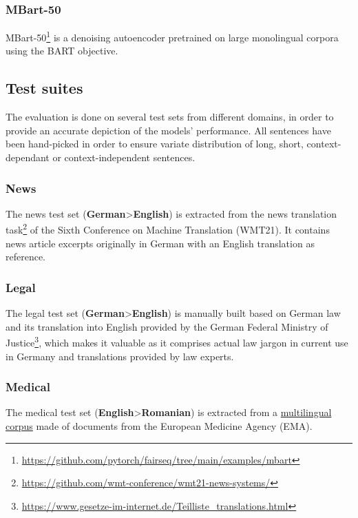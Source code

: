 \documentclass[11pt]{article}
\begin{document}
\subsubsection{MBart-50}
MBart-50\footnote{\url{https://github.com/pytorch/fairseq/tree/main/examples/mbart}} \citep{liu2020multilingual} is a denoising autoencoder pretrained on large monolingual corpora
using the BART \citep{lewis-etal-2020-bart} objective.

\subsection{Test suites}

The evaluation is done on several test sets from different domains, in order to provide
an accurate depiction of the models' performance.
All sentences have been hand-picked in order to ensure variate distribution of
long, short, context-dependant or context-independent sentences.

\subsubsection{News}

The news test set (\textbf{German}>\textbf{English})
is extracted from the news translation
task\footnote{\url{https://github.com/wmt-conference/wmt21-news-systems/}} of the
Sixth Conference on Machine Translation (WMT21).
It contains news article excerpts originally in German with an
English translation as reference.

\subsubsection{Legal}

The legal test set (\textbf{German}>\textbf{English})
is manually built based on German law and its translation into English
provided by the German Federal Ministry of Justice\footnote{
\url{https://www.gesetze-im-internet.de/Teilliste_translations.html}},
which makes it valuable as it comprises actual law jargon in current use in Germany
and translations provided by law experts.

\subsubsection{Medical}

The medical test set (\textbf{English}>\textbf{Romanian}) is extracted from a
\href{https://elrc-share.eu/repository/browse/multilingual-corpus-made-out-of-pdf-documents-from-the-european-medicines-agency-emea-httpswwwemaeuropaeu-february-2020/3cf9da8e858511ea913100155d0267062d01c2d847c349628584d10293948de3/}{multilingual corpus}
made of documents from the European Medicine Agency (EMA).
\end{document}
